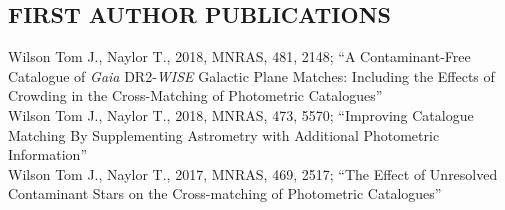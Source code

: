 \documentclass[letter, margin, 10pt]{res} %
\begin{document}
\begin{resume}
\section{FIRST AUTHOR PUBLICATIONS}

Wilson Tom J., Naylor T., 2018, MNRAS, 481, 2148; ``A Contaminant-Free Catalogue of \textit{Gaia} DR2-\textit{WISE} Galactic Plane Matches: Including the Effects of Crowding in the Cross-Matching of Photometric Catalogues''\vspace{2pt}\\
Wilson Tom J., Naylor T., 2018, MNRAS, 473, 5570; ``Improving Catalogue Matching By Supplementing Astrometry with Additional Photometric Information''\vspace{2pt}\\
Wilson Tom J., Naylor T., 2017, MNRAS, 469, 2517; ``The Effect of Unresolved Contaminant Stars on the Cross-matching of Photometric Catalogues''
\vspace{-6pt}

\end{resume}
\end{document}
